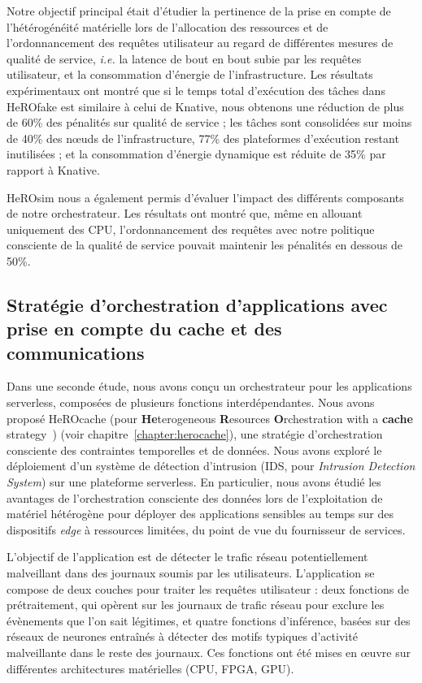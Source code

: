 Notre objectif principal était d'étudier la pertinence de la prise en compte de l'hétérogénéité matérielle lors de l'allocation des ressources et de l'ordonnancement des requêtes utilisateur au regard de différentes mesures de qualité de service, \textit{i.e.} la latence de bout en bout subie par les requêtes utilisateur, et la consommation d'énergie de l'infrastructure. Les résultats expérimentaux ont montré que si le temps total d'exécution des tâches dans HeROfake est similaire à celui de Knative, nous obtenons une réduction de plus de 60\% des pénalités sur qualité de service ; les tâches sont consolidées sur moins de 40\% des nœuds de l'infrastructure, 77\% des plateformes d'exécution restant inutilisées ; et la consommation d'énergie dynamique est réduite de 35\% par rapport à Knative.

HeROsim nous a également permis d'évaluer l'impact des différents composants de notre orchestrateur. Les résultats ont montré que, même en allouant uniquement des \gls{CPU}, l'ordonnancement des requêtes avec notre politique consciente de la qualité de service pouvait maintenir les pénalités en dessous de 50\%.

\subsection{Stratégie d'orchestration d'applications avec prise en compte du cache et des communications}

Dans une seconde étude, nous avons conçu un orchestrateur pour les applications serverless, composées de plusieurs fonctions interdépendantes. Nous avons proposé HeROcache (pour \textbf{He}terogeneous \textbf{R}esources \textbf{O}rchestration with a \textbf{cache} strategy~\cite{herocache}) (voir chapitre~\ref{chapter:herocache}), une stratégie d'orchestration consciente des contraintes temporelles et de données. Nous avons exploré le déploiement d'un système de détection d'intrusion (\gls{IDS}, pour \textit{Intrusion Detection System}) sur une plateforme serverless. En particulier, nous avons étudié les avantages de l'orchestration consciente des données lors de l'exploitation de matériel hétérogène pour déployer des applications sensibles au temps sur des dispositifs \textit{edge} à ressources limitées, du point de vue du fournisseur de services.

L'objectif de l'application est de détecter le trafic réseau potentiellement malveillant dans des journaux soumis par les utilisateurs.
L'application se compose de deux couches pour traiter les requêtes utilisateur : deux fonctions de prétraitement, qui opèrent sur les journaux de trafic réseau pour exclure les évènements que l'on sait légitimes, et quatre fonctions d'inférence, basées sur des réseaux de neurones entraînés à détecter des motifs typiques d'activité malveillante dans le reste des journaux. Ces fonctions ont été mises en œuvre sur différentes architectures matérielles (\gls{CPU}, \gls{FPGA}, \gls{GPU}).

